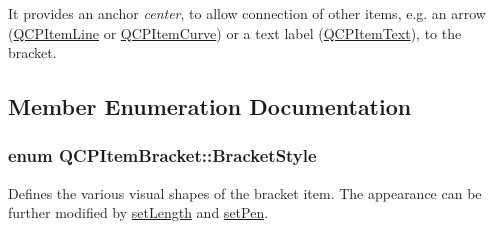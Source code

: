 It provides an anchor {\itshape center}, to allow connection of other items, e.\+g. an arrow (\hyperlink{classQCPItemLine}{Q\+C\+P\+Item\+Line} or \hyperlink{classQCPItemCurve}{Q\+C\+P\+Item\+Curve}) or a text label (\hyperlink{classQCPItemText}{Q\+C\+P\+Item\+Text}), to the bracket. 

\subsection{Member Enumeration Documentation}
\subsubsection[{\texorpdfstring{Bracket\+Style}{BracketStyle}}]{\setlength{\rightskip}{0pt plus 5cm}enum {\bf Q\+C\+P\+Item\+Bracket\+::\+Bracket\+Style}}\hypertarget{classQCPItemBracket_a7ac3afd0b24a607054e7212047d59dbd}{}\label{classQCPItemBracket_a7ac3afd0b24a607054e7212047d59dbd}
Defines the various visual shapes of the bracket item. The appearance can be further modified by \hyperlink{classQCPItemBracket_ac7cfc3da7da9b5c5ac5dfbe4f0351b2a}{set\+Length} and \hyperlink{classQCPItemBracket_ab13001d9cc5d8f9e56ea15bdda682acb}{set\+Pen}.

